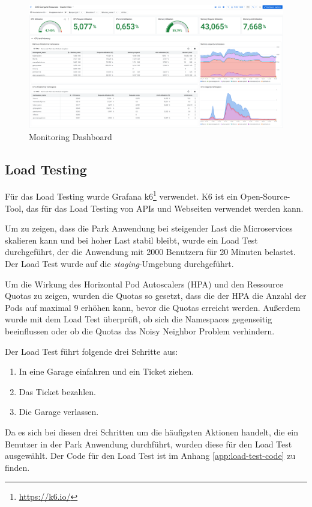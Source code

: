 \begin{figure}[H]
  \centering
  \includegraphics[width=\textwidth]{resources/Monitoring.png}
  \caption{Monitoring Dashboard}
  \label{fig:monitoring-dashboard}
\end{figure}

\subsection{Load Testing}

Für das Load Testing wurde Grafana k6\footnote{\url{https://k6.io/}} verwendet. K6 ist ein Open-Source-Tool,
das für das Load Testing von APIs und Webseiten verwendet werden kann.

Um zu zeigen, dass die Park Anwendung bei steigender Last die Microservices skalieren kann und bei hoher 
Last stabil bleibt, wurde ein Load Test durchgeführt, der die Anwendung mit 2000 Benutzern für 20 Minuten belastet.
Der Load Test wurde auf die \textit{staging}-Umgebung durchgeführt. 

Um die Wirkung des Horizontal Pod Autoscalers (HPA) und den Ressource Quotas zu zeigen, wurden die Quotas so gesetzt,
dass die der HPA die Anzahl der Pods auf maximal 9 erhöhen kann, bevor die Quotas erreicht werden. Außerdem wurde mit 
dem Load Test überprüft, ob sich die Namespaces gegenseitig beeinflussen oder ob die Quotas das Noisy Neighbor Problem verhindern.

Der Load Test führt folgende drei Schritte aus:
\begin{enumerate}
  \item In eine Garage einfahren und ein Ticket ziehen.
  \item Das Ticket bezahlen.
  \item Die Garage verlassen.
\end{enumerate}

Da es sich bei diesen drei Schritten um die häufigsten Aktionen handelt, die ein Benutzer in der Park Anwendung durchführt,
wurden diese für den Load Test ausgewählt. Der Code für den Load Test ist im Anhang \ref{app:load-test-code} zu finden.

